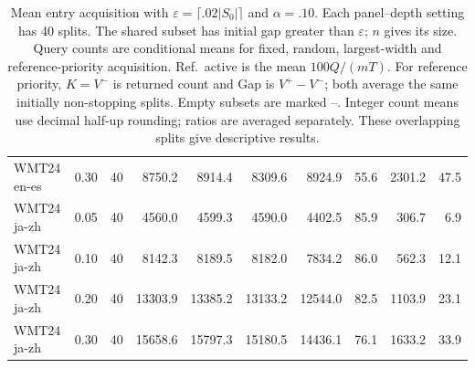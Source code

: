 \begin{table}[t]
\begin{tabular}{llrrrrrrrr}
WMT24 en-es & 0.30 & 40 & 8750.2 & 8914.4 & 8309.6 & 8924.9 & 55.6 & 2301.2 & 47.5 \\
WMT24 ja-zh & 0.05 & 40 & 4560.0 & 4599.3 & 4590.0 & 4402.5 & 85.9 & 306.7 & 6.9 \\
WMT24 ja-zh & 0.10 & 40 & 8142.3 & 8189.5 & 8182.0 & 7834.2 & 86.0 & 562.3 & 12.1 \\
WMT24 ja-zh & 0.20 & 40 & 13303.9 & 13385.2 & 13133.2 & 12544.0 & 82.5 & 1103.9 & 23.1 \\
WMT24 ja-zh & 0.30 & 40 & 15658.6 & 15797.3 & 15180.5 & 14436.1 & 76.1 & 1633.2 & 33.9 \\
\bottomrule
\end{tabular}
\caption{Mean entry acquisition with $\varepsilon=\lceil .02|S_0|\rceil$ and $\alpha=.10$. Each panel--depth setting has 40 splits. The shared subset has initial gap greater than $\varepsilon$; $n$ gives its size. Query counts are conditional means for fixed, random, largest-width and reference-priority acquisition. Ref.\ active is the mean $100Q/(mT)$. For reference priority, $K=V^-$ is returned count and Gap is $V^+-V^-$; both average the same initially non-stopping splits. Empty subsets are marked --. Integer count means use decimal half-up rounding; ratios are averaged separately. These overlapping splits give descriptive results.}
\label{tab:nontrivial-mean-tolerant}
\end{table}
